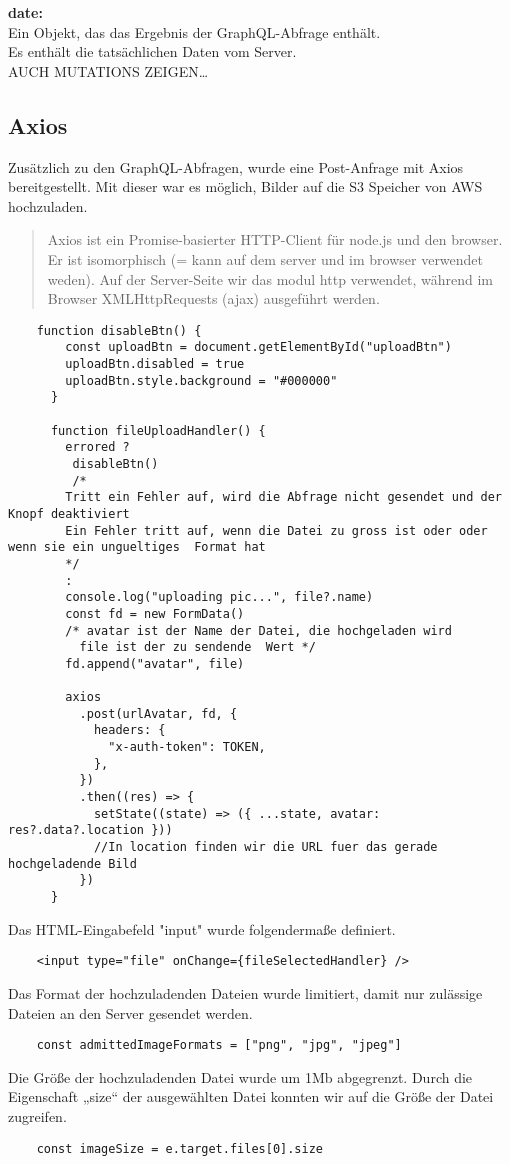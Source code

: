 \textbf{date:}\\
Ein Objekt, das das Ergebnis der GraphQL-Abfrage enthält.
\\Es enthält die tatsächlichen Daten vom Server.
\\

AUCH MUTATIONS ZEIGEN\dots
\newpage
\subsection{Axios}
Zusätzlich zu den GraphQL-Abfragen, wurde eine Post-Anfrage mit Axios bereitgestellt.
Mit dieser war es möglich, Bilder auf die S3 Speicher von AWS hochzuladen.

\begin{quote}
Axios ist ein Promise-basierter HTTP-Client für node.js und den browser. Er ist isomorphisch (= kann auf dem server und im browser verwendet weden). Auf der Server-Seite wir das modul http verwendet, während im Browser XMLHttpRequests (ajax) ausgeführt werden.
\end{quote}

\begin{lstlisting}
    function disableBtn() {
        const uploadBtn = document.getElementById("uploadBtn")
        uploadBtn.disabled = true
        uploadBtn.style.background = "#000000"
      }
    
      function fileUploadHandler() {
        errored ? 
         disableBtn()
         /*
        Tritt ein Fehler auf, wird die Abfrage nicht gesendet und der Knopf deaktiviert 
        Ein Fehler tritt auf, wenn die Datei zu gross ist oder oder wenn sie ein ungueltiges  Format hat
        */
        :
        console.log("uploading pic...", file?.name)
        const fd = new FormData()
        /* avatar ist der Name der Datei, die hochgeladen wird
          file ist der zu sendende  Wert */
        fd.append("avatar", file)  
    
        axios
          .post(urlAvatar, fd, {
            headers: {
              "x-auth-token": TOKEN,
            },
          })
          .then((res) => {
            setState((state) => ({ ...state, avatar: res?.data?.location }))    
            //In location finden wir die URL fuer das gerade hochgeladende Bild 
          })
      }\end{lstlisting}

Das HTML-Eingabefeld "input" wurde folgendermaße definiert.
\begin{lstlisting}
    <input type="file" onChange={fileSelectedHandler} />
\end{lstlisting}


Das Format der hochzuladenden Dateien wurde limitiert, damit nur zulässige Dateien an den Server gesendet werden.
\begin{lstlisting}
    const admittedImageFormats = ["png", "jpg", "jpeg"]
\end{lstlisting}

Die Größe der hochzuladenden Datei wurde um 1Mb abgegrenzt.
Durch die Eigenschaft „size“ der ausgewählten Datei konnten wir auf die Größe der Datei zugreifen.
\begin{lstlisting}
    const imageSize = e.target.files[0].size
\end{lstlisting}